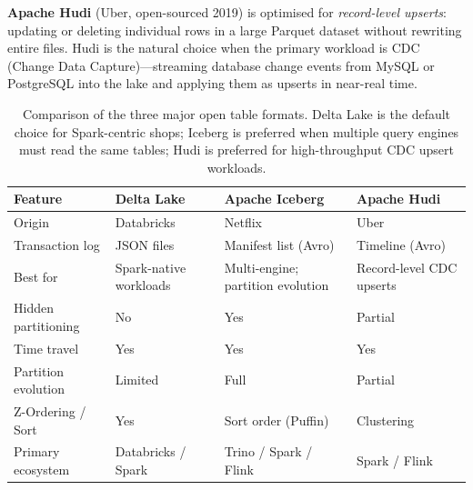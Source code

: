 \textbf{Apache Hudi} (Uber, open-sourced 2019) is optimised for
\emph{record-level upserts}: updating or deleting individual rows in a
large Parquet dataset without rewriting entire files. Hudi is the natural
choice when the primary workload is CDC (Change Data Capture)---streaming
database change events from MySQL or PostgreSQL into the lake and applying
them as upserts in near-real time.

\begin{table}[htbp]
\centering
\renewcommand{\arraystretch}{1.4}
\begin{tabular}{lp{3.2cm}p{3.2cm}p{3.2cm}}
  \toprule
  \textbf{Feature} & \textbf{Delta Lake}
    & \textbf{Apache Iceberg} & \textbf{Apache Hudi} \\
  \midrule
  Origin & Databricks & Netflix & Uber \\
  Transaction log & JSON files & Manifest list (Avro) & Timeline (Avro) \\
  Best for & Spark-native workloads & Multi-engine; partition evolution
    & Record-level CDC upserts \\
  Hidden partitioning & No & Yes & Partial \\
  Time travel & Yes & Yes & Yes \\
  Partition evolution & Limited & Full & Partial \\
  Z-Ordering / Sort & Yes & Sort order (Puffin) & Clustering \\
  Primary ecosystem & Databricks / Spark & Trino / Spark / Flink
    & Spark / Flink \\
  \bottomrule
\end{tabular}
\caption{Comparison of the three major open table formats. Delta Lake
         is the default choice for Spark-centric shops; Iceberg is
         preferred when multiple query engines must read the same tables;
         Hudi is preferred for high-throughput CDC upsert workloads.}
\label{tab:table-formats}
\end{table}

